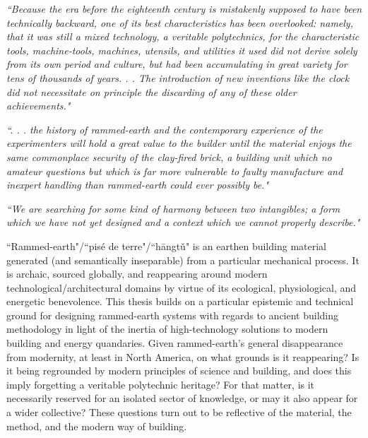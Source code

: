 \begin{flushright}
\small{
\textit{
``Because the era before the eighteenth century is mistakenly supposed to have been technically backward, one of its best characteristics has been overlooked: namely, that it was still a mixed technology, a veritable polytechnics, for the characteristic tools, machine-tools, machines, utensils, and utilities it used did not derive solely from its own period and culture, but had been accumulating in great variety for tens of thousands of years. . . The introduction of new inventions like the clock did not necessitate on principle the discarding of any of these older achievements." \cite[p.134]{MYTHMACHINE}}}
\end{flushright}

\begin{flushright}
  \small{
  \textit{``. . . the history of rammed-earth and the contemporary
experience of the experimenters will hold a great value to
the builder until the material enjoys the same commonplace
security of the clay-fired brick, a building unit which no
amateur questions but which is far more vulnerable to
faulty manufacture and inexpert handling than rammed-earth
could ever possibly be." \cite[p.xvi]{RAMMEDEARTHHOUSE}}}
\end{flushright}

\begin{flushright}
  \small{
  \textit{``We are searching for some kind of harmony between two intangibles; a form which we have not yet designed and a context which we cannot properly describe." \cite[p.26]{SYNOFFORM}}}
\end{flushright}

``Rammed-earth"/``pis\'e de terre"/``h\=angt\v u" is an earthen building material generated (and semantically inseparable) from a particular mechanical process. It is archaic, sourced globally, and reappearing around modern technological/architectural domains by virtue of its ecological, physiological, and energetic benevolence. This thesis builds on a particular epistemic and technical ground for designing rammed-earth systems with regards to ancient building methodology in light of the inertia of high-technology solutions to modern building and energy quandaries.  Given rammed-earth's general disappearance from modernity, at least in North America, on what grounds is it reappearing? Is it being regrounded by modern principles of science and building, and does this imply forgetting a veritable polytechnic heritage? For that matter, is it necessarily reserved for an isolated sector of knowledge, or may it also appear for a wider collective? These questions turn out to be reflective of the material, the method, and the modern way of building.

